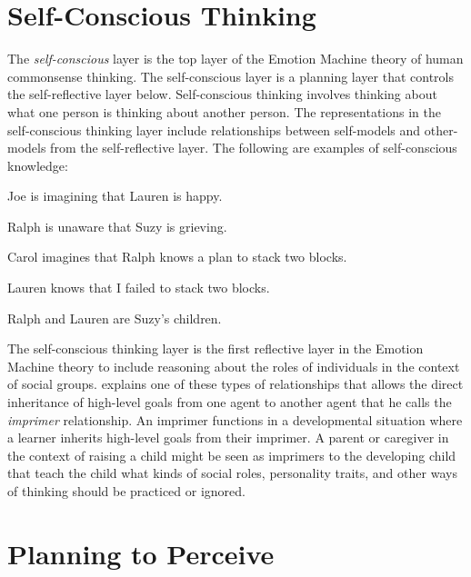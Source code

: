 \section{Self-Conscious Thinking}

The {\emph{self-conscious}} layer is the top layer of the Emotion
Machine theory of human commonsense thinking.  The self-conscious
layer is a planning layer that controls the self-reflective layer
below.  Self-conscious thinking involves thinking about what one
person is thinking about another person.  The representations in the
self-conscious thinking layer include relationships between
self-models and other-models from the self-reflective layer.  The
following are examples of self-conscious knowledge:
\begin{packed_itemize}
\item{Joe is imagining that Lauren is happy.}
\item{Ralph is unaware that Suzy is grieving.}
\item{Carol imagines that Ralph knows a plan to stack two blocks.}
\item{Lauren knows that I failed to stack two blocks.}
\item{Ralph and Lauren are Suzy's children.}
\end{packed_itemize}
The self-conscious thinking layer is the first reflective layer in the
Emotion Machine theory to include reasoning about the roles of
individuals in the context of social groups.  \cite{minsky:2006}
explains one of these types of relationships that allows the direct
inheritance of high-level goals from one agent to another agent that
he calls the {\emph{imprimer}} relationship.  An imprimer functions in
a developmental situation where a learner inherits high-level goals
from their imprimer.  A parent or caregiver in the context of raising
a child might be seen as imprimers to the developing child that teach
the child what kinds of social roles, personality traits, and other
ways of thinking should be practiced or ignored.

\section{Planning to Perceive}

